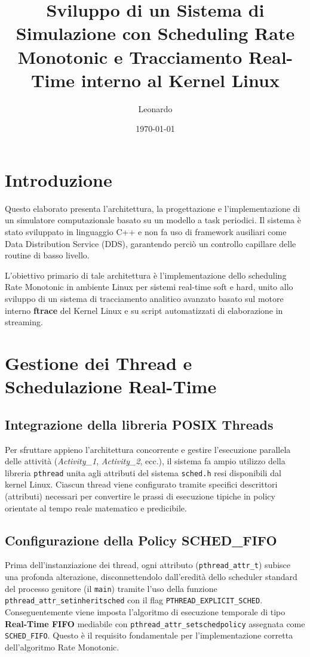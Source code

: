 \documentclass[a4paper,12pt]{report}
\title{Sviluppo di un Sistema di Simulazione con Scheduling Rate Monotonic e Tracciamento Real-Time interno al Kernel Linux}
\author{Leonardo}
\date{\today}
\begin{document}
\maketitle
\tableofcontents

\chapter{Introduzione}
Questo elaborato presenta l'architettura, la progettazione e l'implementazione di un simulatore computazionale basato su un modello a task periodici. Il sistema è stato sviluppato in linguaggio C++ e non fa uso di framework ausiliari come Data Distribution Service (DDS), garantendo perciò un controllo capillare delle routine di basso livello. 

L'obiettivo primario di tale architettura è l'implementazione dello scheduling Rate Monotonic in ambiente Linux per sistemi real-time soft e hard, unito allo sviluppo di un sistema di tracciamento analitico avanzato basato sul motore interno \textbf{ftrace} del Kernel Linux e su script automatizzati di elaborazione in streaming.

\chapter{Gestione dei Thread e Schedulazione Real-Time}
\section{Integrazione della libreria POSIX Threads}
Per sfruttare appieno l'architettura concorrente e gestire l'esecuzione parallela delle attività (\textit{Activity\_1}, \textit{Activity\_2}, ecc.), il sistema fa ampio utilizzo della libreria \texttt{pthread} unita agli attributi del sistema \texttt{sched.h} resi disponibili dal kernel Linux.
Ciascun thread viene configurato tramite specifici descrittori (attributi) necessari per convertire le prassi di esecuzione tipiche in policy orientate al tempo reale matematico e predicibile. 

\section{Configurazione della Policy SCHED\_FIFO}
Prima dell'instanziazione dei thread, ogni attributo (\verb!pthread_attr_t!) subisce una profonda alterazione, disconnettendolo dall'eredità dello scheduler standard del processo genitore (il \verb!main!) tramite l'uso della funzione \verb!pthread_attr_setinheritsched! con il flag \verb!PTHREAD_EXPLICIT_SCHED!.
Conseguentemente viene imposta l'algoritmo di esecuzione temporale di tipo \textbf{Real-Time FIFO} mediabile con \verb!pthread_attr_setschedpolicy! assegnata come \verb!SCHED_FIFO!.
Questo è il requisito fondamentale per l'implementazione corretta dell'algoritmo Rate Monotonic.
\end{document}
